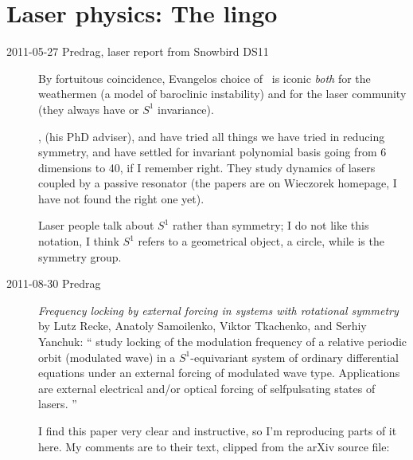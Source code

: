 
\chapter{Laser physics: The lingo}
\label{chap:lasers}

\renewcommand{\LieElrep}{\ensuremath{\mathbf{G}}} %
\renewcommand{\LieEl}{\ensuremath{\gamma}}  %
\renewcommand{\gSpace}{\ensuremath{{\bf \theta}}}   %


\begin{description}

\item[2011-05-27 Predrag, laser report from Snowbird DS11]
												\toCB
By fortuitous coincidence, Evangelos choice of \CLe\ is iconic
{\em both}  for
the weathermen (a model of baroclinic instability) and for the laser
community (they always have  or $S^1$ invariance).

,
 (his PhD adviser), and
have tried all things we have tried in reducing  symmetry, and
have settled for invariant polynomial basis going from 6 dimensions to 40,
if I remember right. They study dynamics of
lasers coupled by a passive resonator (the papers are on Wieczorek
homepage, I have not found the right one yet).

												\toCB
Laser people talk about $S^1$ rather than  symmetry;
I do not like this notation, I think $S^1$ refers to a geometrical
object, a circle, while  is the symmetry group.


\item[2011-08-30 Predrag]
{\em Frequency locking by external forcing in systems with rotational
symmetry } by Lutz Recke, Anatoly Samoilenko, Viktor Tkachenko, and
Serhiy Yanchuk: `` study locking of the modulation
frequency of a relative periodic orbit (modulated wave) in a
$S^{1}$-equivariant system of ordinary differential equations under an
external forcing of modulated wave type. Applications are external
electrical and/or optical forcing of selfpulsating states of lasers.
''

I find this paper very clear and instructive, so I'm reproducing parts of
it here. My comments are to their text, clipped from the arXiv source
file:


\end{description}
